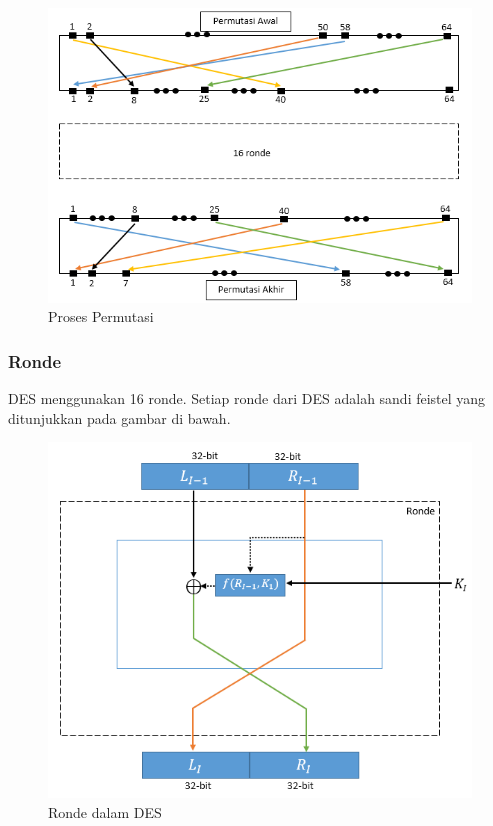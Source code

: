 \begin{figure}[h]
\includegraphics[scale=0.5]{Gambar/proses_permutasi}
\centering
\caption{Proses Permutasi}
\end{figure}

\subsubsection{Ronde}
DES menggunakan 16 ronde. Setiap ronde dari DES adalah sandi feistel yang ditunjukkan pada gambar di bawah.

\begin{figure}[h]
\includegraphics[]{Gambar/round}
\centering
\caption{Ronde dalam DES}
\end{figure}

